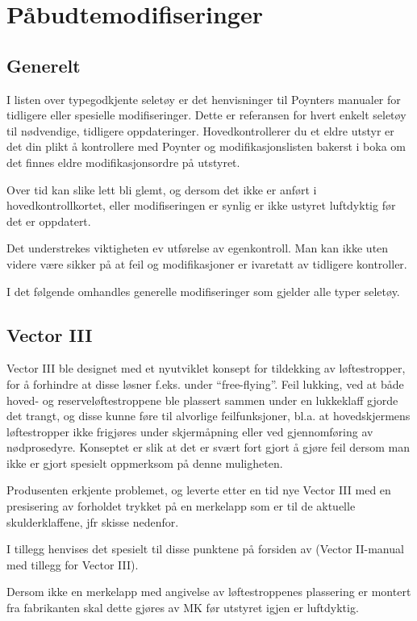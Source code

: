 \section{Påbudtemodifiseringer}
\subsection{Generelt}
I listen over typegodkjente seletøy er det henvisninger til Poynters manualer for tidligere eller spesielle modifiseringer. Dette er referansen for hvert enkelt seletøy til nødvendige, tidligere oppdateringer. Hovedkontrollerer du et eldre utstyr er det din plikt å kontrollere med Poynter og modifikasjonslisten bakerst i boka om det finnes eldre modifikasjonsordre på utstyret.

Over tid kan slike lett bli glemt, og dersom det ikke er anført i hovedkontrollkortet, eller modifiseringen er synlig er ikke ustyret luftdyktig før det er oppdatert.

Det understrekes viktigheten ev utførelse av egenkontroll. Man kan ikke uten videre være sikker på at feil og modifikasjoner er ivaretatt av tidligere kontroller.

I det følgende omhandles generelle modifiseringer som gjelder alle typer seletøy.

\subsection{Vector III}
Vector III ble designet med et nyutviklet konsept for tildekking av løftestropper, for å forhindre at disse løsner f.eks. under ``free-flying''. Feil lukking, ved at både hoved- og reserveløftestroppene ble plassert sammen under en lukkeklaff gjorde det trangt, og disse kunne føre til alvorlige feilfunksjoner, bl.a. at hovedskjermens løftestropper ikke frigjøres under skjermåpning eller ved gjennomføring av nødprosedyre. Konseptet er slik at det er svært fort gjort å gjøre feil dersom man ikke er gjort spesielt oppmerksom på denne muligheten.

Produsenten erkjente problemet, og leverte etter en tid nye Vector III med en presisering av forholdet trykket på en merkelapp som er til de aktuelle skulderklaffene, jfr skisse nedenfor.

I tillegg henvises det spesielt til disse punktene på forsiden av (Vector II-manual med tillegg for Vector III).

Dersom ikke en merkelapp med angivelse av løftestroppenes plassering er montert fra fabrikanten skal dette gjøres av MK før utstyret igjen er luftdyktig.


